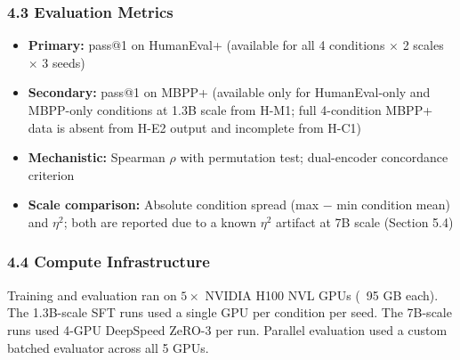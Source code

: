 \subsubsection{4.3 Evaluation Metrics}

\begin{itemize}
\item \textbf{Primary:} pass@1 on HumanEval+ (available for all 4 conditions $\times$ 2 scales $\times$ 3 seeds)
\item \textbf{Secondary:} pass@1 on MBPP+ (available only for HumanEval-only and MBPP-only conditions at 1.3B scale from H-M1; full 4-condition MBPP+ data is absent from H-E2 output and incomplete from H-C1)
\item \textbf{Mechanistic:} Spearman $\rho$ with permutation test; dual-encoder concordance criterion
\item \textbf{Scale comparison:} Absolute condition spread (max $-$ min condition mean) and $\eta^2$; both are reported due to a known $\eta^2$ artifact at 7B scale (Section 5.4)
\end{itemize}

\subsubsection{4.4 Compute Infrastructure}

Training and evaluation ran on $5\times$ NVIDIA H100 NVL GPUs (~95 GB each). The 1.3B-scale SFT runs used a single GPU per condition per seed. The 7B-scale runs used 4-GPU DeepSpeed ZeRO-3 per run. Parallel evaluation used a custom batched evaluator across all 5 GPUs.

